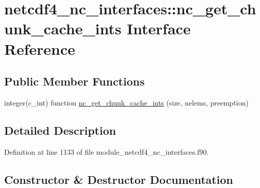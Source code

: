 \hypertarget{interfacenetcdf4__nc__interfaces_1_1nc__get__chunk__cache__ints}{}\section{netcdf4\+\_\+nc\+\_\+interfaces\+:\+:nc\+\_\+get\+\_\+chunk\+\_\+cache\+\_\+ints Interface Reference}
\label{interfacenetcdf4__nc__interfaces_1_1nc__get__chunk__cache__ints}
\subsection*{Public Member Functions}
\begin{DoxyCompactItemize}
\item 
integer(c\+\_\+int) function \hyperlink{interfacenetcdf4__nc__interfaces_1_1nc__get__chunk__cache__ints_a34cdbdbb67fd051a62a27f3d36c2453c}{nc\+\_\+get\+\_\+chunk\+\_\+cache\+\_\+ints} (size, nelems, preemption)
\end{DoxyCompactItemize}


\subsection{Detailed Description}


Definition at line 1133 of file module\+\_\+netcdf4\+\_\+nc\+\_\+interfaces.\+f90.



\subsection{Constructor \& Destructor Documentation}
\mbox{\label{interfacenetcdf4__nc__interfaces_1_1nc__get__chunk__cache__ints_a34cdbdbb67fd051a62a27f3d36c2453c}} 
